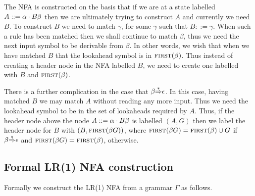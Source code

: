 The NFA is constructed on the basis that if we are at a state labelled
$A::=\alpha\cdot B\beta$ then
we are ultimately trying to construct $A$ and
currently we need $B$. To construct $B$ we need to match $\gamma$,
for some $\gamma$ such that $B::=\gamma$. When such a rule has been
matched then we shall continue to match $\beta$, thus we need the next
input symbol to be derivable from $\beta$. In other words, we wish that
when we have matched $B$ that the lookahead symbol is in
$\mbox{\sc first}(\beta)$. Thus instead of creating a header node in the NFA
labelled $B$, we need to create one labelled with $B$ and 
$\mbox{\sc first}(\beta)$. 

There is a further complication in the case that
$\beta{\mathop{\Rightarrow}\limits^*}\epsilon$. In this case, having matched $B$ we may match $A$
without reading any more input. Thus we need the lookahead symbol to
be in the set of lookaheads required by $A$. Thus, if the header node
above the node $A::=\alpha\cdot B\beta$ is labelled $(A,G)$ then
we label the header node for $B$ with $(B,\mbox{\sc first}(\beta G))$,
where $\mbox{\sc first}(\beta G)=\mbox{\sc first}(\beta)\cup G$ if $\beta{\mathop{\Rightarrow}\limits^*}\epsilon$
and $\mbox{\sc first}(\beta G)=\mbox{\sc first}(\beta)$, otherwise.

\subsection{Formal LR(1) NFA construction}\label{lr1}

Formally we construct the LR(1) NFA from a grammar $\Gamma$ as
follows.

